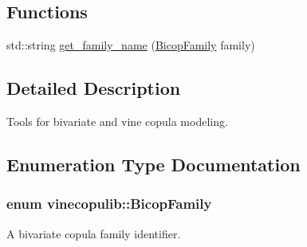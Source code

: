 \subsection*{Functions}
\begin{DoxyCompactItemize}
\item 
std\+::string \hyperlink{namespacevinecopulib_ac46553ae5f99072f65e9d3254d2c526d}{get\+\_\+family\+\_\+name} (\hyperlink{namespacevinecopulib_a42e95cc06d33896199caab0c11ad44f3}{Bicop\+Family} family)
\end{DoxyCompactItemize}


\subsection{Detailed Description}
Tools for bivariate and vine copula modeling. 

\subsection{Enumeration Type Documentation}
\hypertarget{namespacevinecopulib_a42e95cc06d33896199caab0c11ad44f3}{
\subsubsection[{Bicop\+Family}]{\setlength{\rightskip}{0pt plus 5cm}enum {\bf vinecopulib\+::\+Bicop\+Family}\hspace{0.3cm}{\ttfamily [strong]}}}\label{namespacevinecopulib_a42e95cc06d33896199caab0c11ad44f3}


A bivariate copula family identifier. 

